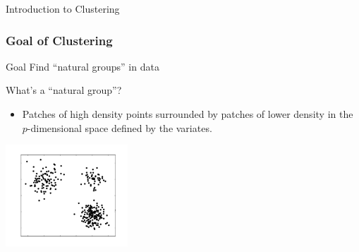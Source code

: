 \documentclass{beamer}
\begin{document}
\begin{frame}[plain,c]


\begin{center}

\Huge Introduction to Clustering

\end{center}


\end{frame}

\begin{frame}
  \frametitle{Goal of Clustering}

\begin{block}{Goal}
Find ``natural groups'' in data
\end{block}

What's a ``natural group''?

\begin{itemize}
  \item Patches of high density points surrounded by patches of lower density in the $p$-dimensional space defined by the variates.
\end{itemize}

\begin{center}
\includegraphics[height=1.5in]{cluster-fig.pdf}
\end{center}

\end{frame}



{ 

}
\end{document}
